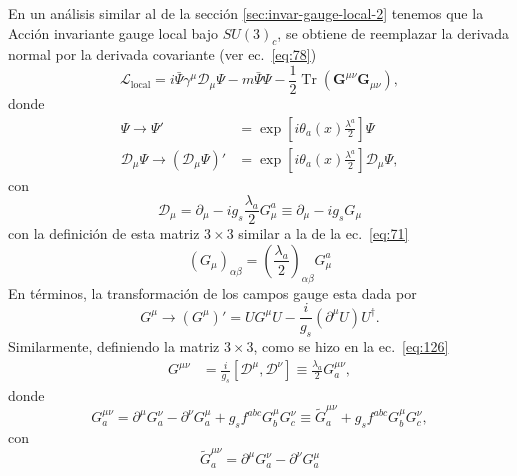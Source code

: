 En un an\'alisis similar al de la secci\'on \ref{sec:invar-gauge-local-2} tenemos que la Acci\'on invariante gauge local bajo $SU(3)_c$, se obtiene de reemplazar la derivada normal por la derivada covariante (ver ec.~\eqref{eq:78})
\begin{equation}
  \label{eq:127}
  \mathcal{L}_{\text{local}}=i\bar{\Psi}\gamma^\mu\mathcal{D}_\mu\Psi-m\bar{\Psi}\Psi
  -\frac{1}{2}\operatorname{Tr}\left(\mathbf{G}^{\mu\nu}\mathbf{G}_{\mu\nu}\right),
\end{equation}
donde
\begin{align}
  \Psi\to \Psi'&=\exp\left[i\theta_a(x)\frac{\lambda^a}{2}\right]\Psi\nonumber\\
  \mathcal{D}_\mu\Psi\to \left(\mathcal{D}_\mu\Psi\right)'&
  =\exp\left[i\theta_a(x)\frac{\lambda^a}{2}\right]\mathcal{D}_\mu\Psi,
\end{align}
con
\begin{equation}
  \mathcal{D}_\mu=\partial_\mu-i g_s\frac{\lambda_a}{2}G_\mu^a\equiv\partial_\mu-i g_s {G}_\mu
\end{equation}
con la definici\'on de esta matriz $3\times3$ similar a la de la ec.~\eqref{eq:71}
\begin{equation}
  \left({G}_\mu\right)_{\alpha\beta}=\left(\frac{\lambda_a}{2}\right)_{\alpha\beta}G_\mu^a
\end{equation}
En t\'erminos, la transformaci\'on de los campos gauge esta dada por
\begin{equation}
    {G}^\mu\to\left({G}^\mu\right)'=U{G}^\mu U-\frac{i}{g_s}\left(\partial^\mu U\right)U^\dagger.
\end{equation}
Similarmente, definiendo la matriz $3\times3$, como se hizo en la ec.~\eqref{eq:126}
\begin{align}
  {G}^{\mu\nu}&=\frac{i}{g_s}[\mathcal{D}^\mu,\mathcal{D}^\nu]\equiv\frac{\lambda_a}{2}G^{\mu\nu}_a,
\end{align}
donde
\begin{equation}
  \label{eq:258}
  G^{\mu\nu}_a=\partial^\mu G^\nu_a-\partial^\nu G^\mu_a+g_s f^{abc}G^\mu_b G^\nu_c\equiv\widetilde{G}^{\mu\nu}_a+g_s f^{abc}G^\mu_b G^\nu_c,
\end{equation}
con
\begin{equation}
  \widetilde{G}^{\mu\nu}_a=\partial^\mu G^\nu_a-\partial^\nu G^\mu_a
\end{equation}

